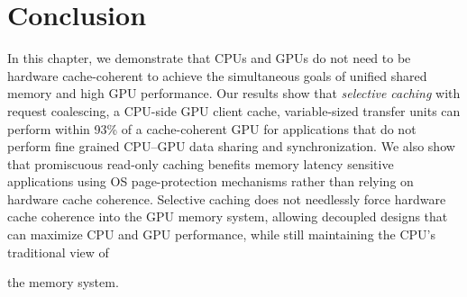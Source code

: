 \section{Conclusion}

In this chapter, we demonstrate that CPUs and GPUs do not need to be hardware
cache-coherent to achieve the simultaneous goals of unified shared memory and
high GPU performance.  Our results show that \textit{selective caching} with
request coalescing, a CPU-side GPU client cache, variable-sized transfer units
can perform within 93\% of a cache-coherent GPU for applications that do not
perform fine grained CPU--GPU data sharing and synchronization. We also show
that promiscuous read-only caching benefits memory latency sensitive
applications using OS page-protection mechanisms rather than relying on hardware
cache coherence.  Selective caching does not needlessly force hardware cache
coherence into the GPU memory system, allowing decoupled designs that can
maximize CPU and GPU performance, while still maintaining the CPU's traditional
view of the memory system.
